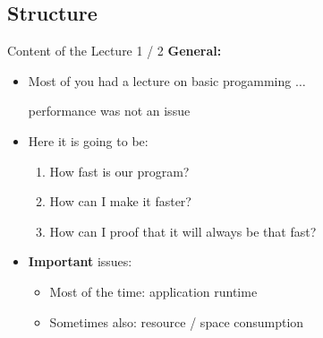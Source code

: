 \subsection{Structure}

\begin{frame}{Content of the Lecture 1 / 2}
  \textbf{General:}
  \begin{itemize}
    \item
      Most of you had a lecture on basic progamming $\ldots$
      \begin{center}\color{MainA}performance was not an issue\end{center}
      \vspace{1em}
    \item<2- | handout: 1>
      Here it is going to be:
      \begin{enumerate}
        \item<3- | handout: 1>
          How fast is our program?
        \item<4- | handout: 1>
          How can I make it faster?
        \item<5- | handout: 1>
          How can I proof that it will always be that fast?
      \end{enumerate}
      \vspace{1em}
    \item<6- |handout:1>
      \textbf{Important} issues:
      \begin{itemize}
        \item
          Most of the time: application {\color{MainA}runtime}
        \item
          Sometimes also: resource / {\color{MainA}space consumption}
      \end{itemize}
  \end{itemize}
\end{frame}


